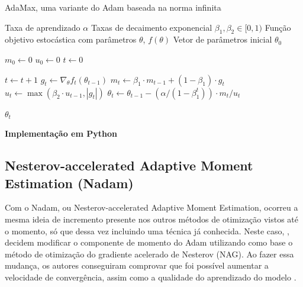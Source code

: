 \begin{algorithm}[H] %
    \caption{AdaMax, uma variante do Adam baseada na norma infinita}
    \label{alg:adamax}
    \begin{algorithmic}[1] %

    \Require Taxa de aprendizado $\alpha$
    \Require Taxas de decaimento exponencial $\beta_1, \beta_2 \in [0, 1)$
    \Require Função objetivo estocástica com parâmetros $\theta$, $f(\theta)$
    \Require Vetor de parâmetros inicial $\theta_0$

    \State $m_0 \leftarrow 0$ 
    \State $u_0 \leftarrow 0$ 
    \State $t \leftarrow 0$ 

        \State $t \leftarrow t + 1$
        \State $g_t \leftarrow \nabla_\theta f_t(\theta_{t-1})$ 
        \State $m_t \leftarrow \beta_1 \cdot m_{t-1} + (1 - \beta_1) \cdot g_t$ 
        \State $u_t \leftarrow \max(\beta_2 \cdot u_{t-1}, |g_t|)$ 
        \State $\theta_t \leftarrow \theta_{t-1} - (\alpha / (1 - \beta_1^t)) \cdot m_t / u_t$ 
    \EndWhile

    \State \Return $\theta_t$ 
    \end{algorithmic}
\end{algorithm}

\textbf{Implementação em Python}

\subsection{Nesterov-accelerated Adaptive Moment Estimation (Nadam)}

Com o Nadam, ou Nesterov-accelerated Adaptive Moment Estimation, ocorreu a mesma ideia de incremento presente nos outros métodos de otimização vistos até o momento, só que dessa vez incluindo uma técnica já conhecida. Neste caso, \textcite{NadamMethod}, decidem modificar o componente de momento do Adam utilizando como base o método de otimização do gradiente acelerado de Nesterov (NAG). Ao fazer essa mudança, os autores conseguiram comprovar que foi possível aumentar a velocidade de convergência, assim como a qualidade do aprendizado do modelo \parencite{NadamMethod}.

